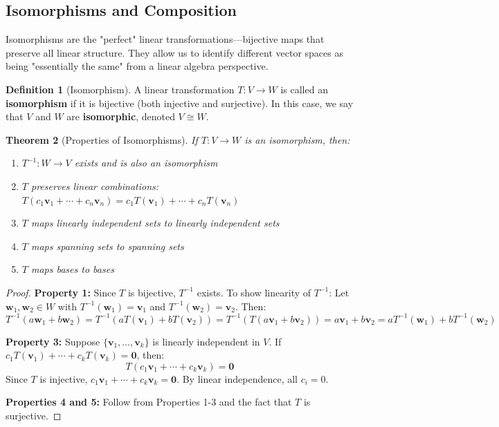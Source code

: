 \documentclass[12pt]{article}
\numberwithin{equation}{section}
\newcommand{\vect}[1]{\boldsymbol{#1}}   %
\theoremstyle{plain}
\newtheorem{theorem}{Theorem}[section]
\theoremstyle{definition}
\newtheorem{definition}[theorem]{Definition}
\theoremstyle{remark}
\begin{document}
\subsection{Isomorphisms and Composition}

Isomorphisms are the "perfect" linear transformations—bijective maps that preserve all linear structure. They allow us to identify different vector spaces as being "essentially the same" from a linear algebra perspective.

\begin{definition}[Isomorphism]
A linear transformation $T: V \to W$ is called an \textbf{isomorphism} if it is bijective (both injective and surjective). In this case, we say that $V$ and $W$ are \textbf{isomorphic}, denoted $V \cong W$.
\end{definition}

\begin{theorem}[Properties of Isomorphisms]
If $T: V \to W$ is an isomorphism, then:
\begin{enumerate}
\item $T^{-1}: W \to V$ exists and is also an isomorphism
\item $T$ preserves linear combinations: $T(c_1\vect{v}_1 + \cdots + c_n\vect{v}_n) = c_1T(\vect{v}_1) + \cdots + c_nT(\vect{v}_n)$
\item $T$ maps linearly independent sets to linearly independent sets
\item $T$ maps spanning sets to spanning sets
\item $T$ maps bases to bases
\end{enumerate}
\end{theorem}

\begin{proof}
\textbf{Property 1:} Since $T$ is bijective, $T^{-1}$ exists. To show linearity of $T^{-1}$:
Let $\vect{w}_1, \vect{w}_2 \in W$ with $T^{-1}(\vect{w}_1) = \vect{v}_1$ and $T^{-1}(\vect{w}_2) = \vect{v}_2$. Then:
$$T^{-1}(a\vect{w}_1 + b\vect{w}_2) = T^{-1}(aT(\vect{v}_1) + bT(\vect{v}_2)) = T^{-1}(T(a\vect{v}_1 + b\vect{v}_2)) = a\vect{v}_1 + b\vect{v}_2 = aT^{-1}(\vect{w}_1) + bT^{-1}(\vect{w}_2)$$

\textbf{Property 3:} Suppose $\{\vect{v}_1, \ldots, \vect{v}_k\}$ is linearly independent in $V$. If $c_1T(\vect{v}_1) + \cdots + c_kT(\vect{v}_k) = \vect{0}$, then:
$$T(c_1\vect{v}_1 + \cdots + c_k\vect{v}_k) = \vect{0}$$
Since $T$ is injective, $c_1\vect{v}_1 + \cdots + c_k\vect{v}_k = \vect{0}$. By linear independence, all $c_i = 0$.

\textbf{Properties 4 and 5:} Follow from Properties 1-3 and the fact that $T$ is surjective.
\end{proof}
\end{document}
